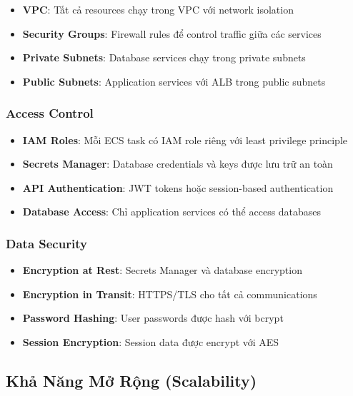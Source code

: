 \begin{itemize}
    \item \textbf{VPC}: Tất cả resources chạy trong VPC với network isolation
    \item \textbf{Security Groups}: Firewall rules để control traffic giữa các services
    \item \textbf{Private Subnets}: Database services chạy trong private subnets
    \item \textbf{Public Subnets}: Application services với ALB trong public subnets
\end{itemize}

\subsubsection{Access Control}

\begin{itemize}
    \item \textbf{IAM Roles}: Mỗi ECS task có IAM role riêng với least privilege principle
    \item \textbf{Secrets Manager}: Database credentials và keys được lưu trữ an toàn
    \item \textbf{API Authentication}: JWT tokens hoặc session-based authentication
    \item \textbf{Database Access}: Chỉ application services có thể access databases
\end{itemize}

\subsubsection{Data Security}

\begin{itemize}
    \item \textbf{Encryption at Rest}: Secrets Manager và database encryption
    \item \textbf{Encryption in Transit}: HTTPS/TLS cho tất cả communications
    \item \textbf{Password Hashing}: User passwords được hash với bcrypt
    \item \textbf{Session Encryption}: Session data được encrypt với AES
\end{itemize}

\subsection{Khả Năng Mở Rộng (Scalability)}

